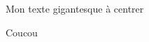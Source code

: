 \begin{center}
    \Huge{Mon texte gigantesque à centrer}
\end{center}
\vfill
\Large{Coucou}
\vfill
